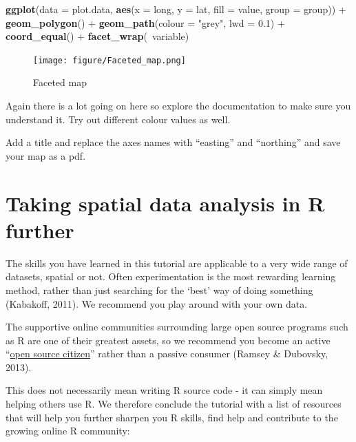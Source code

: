 \documentclass[]{article}
\newenvironment{Shaded}{}{}
\newcommand{\KeywordTok}[1]{\textcolor[rgb]{0.00,0.44,0.13}{\textbf{{#1}}}}
\newcommand{\DataTypeTok}[1]{\textcolor[rgb]{0.56,0.13,0.00}{{#1}}}
\newcommand{\FloatTok}[1]{\textcolor[rgb]{0.25,0.63,0.44}{{#1}}}
\newcommand{\StringTok}[1]{\textcolor[rgb]{0.25,0.44,0.63}{{#1}}}
\newcommand{\NormalTok}[1]{{#1}}
\begin{document}
\begin{Shaded}
\begin{Highlighting}[]
\KeywordTok{ggplot}\NormalTok{(}\DataTypeTok{data =} \NormalTok{plot.data, }\KeywordTok{aes}\NormalTok{(}\DataTypeTok{x =} \NormalTok{long, }\DataTypeTok{y =} \NormalTok{lat, }\DataTypeTok{fill =} \NormalTok{value, }\DataTypeTok{group =} \NormalTok{group)) + }
    \KeywordTok{geom_polygon}\NormalTok{() + }\KeywordTok{geom_path}\NormalTok{(}\DataTypeTok{colour =} \StringTok{"grey"}\NormalTok{, }\DataTypeTok{lwd =} \FloatTok{0.1}\NormalTok{) + }\KeywordTok{coord_equal}\NormalTok{() + }
    \KeywordTok{facet_wrap}\NormalTok{(~variable)}
\end{Highlighting}
\end{Shaded}
\begin{figure}[htbp]
\centering
\texttt{[image: figure/Faceted\_map.png]}
\caption{Faceted map}
\end{figure}

Again there is a lot going on here so explore the documentation to make
sure you understand it. Try out different colour values as well.

Add a title and replace the axes names with ``easting'' and ``northing''
and save your map as a pdf.

\section{Taking spatial data analysis in R further}

The skills you have learned in this tutorial are applicable to a very
wide range of datasets, spatial or not. Often experimentation is the
most rewarding learning method, rather than just searching for the
`best' way of doing something (Kabakoff, 2011). We recommend you play
around with your own data.

The supportive online communities surrounding large open source programs
such as R are one of their greatest assets, so we recommend you become
an active
``\href{http://blog.cleverelephant.ca/2013/10/being-open-source-citizen.html}{open
source citizen}'' rather than a passive consumer (Ramsey \& Dubovsky,
2013).

This does not necessarily mean writing R source code - it can simply
mean helping others use R. We therefore conclude the tutorial with a
list of resources that will help you further sharpen you R skills, find
help and contribute to the growing online R community:
\end{document}
